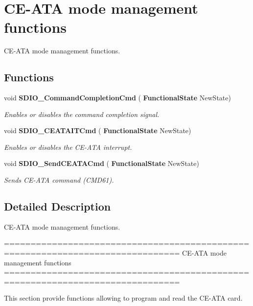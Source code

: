 \section{C\+E-\/\+A\+TA mode management functions}
\label{group__SDIO__Group5}


C\+E-\/\+A\+TA mode management functions.  


\subsection*{Functions}
\begin{DoxyCompactItemize}
\item 
void \textbf{ S\+D\+I\+O\+\_\+\+Command\+Completion\+Cmd} (\textbf{ Functional\+State} New\+State)
\begin{DoxyCompactList}\small\item\em Enables or disables the command completion signal. \end{DoxyCompactList}\item 
void \textbf{ S\+D\+I\+O\+\_\+\+C\+E\+A\+T\+A\+I\+T\+Cmd} (\textbf{ Functional\+State} New\+State)
\begin{DoxyCompactList}\small\item\em Enables or disables the C\+E-\/\+A\+TA interrupt. \end{DoxyCompactList}\item 
void \textbf{ S\+D\+I\+O\+\_\+\+Send\+C\+E\+A\+T\+A\+Cmd} (\textbf{ Functional\+State} New\+State)
\begin{DoxyCompactList}\small\item\em Sends C\+E-\/\+A\+TA command (C\+M\+D61). \end{DoxyCompactList}\end{DoxyCompactItemize}


\subsection{Detailed Description}
C\+E-\/\+A\+TA mode management functions. 

\begin{DoxyVerb} ===============================================================================
              CE-ATA mode management functions
 ===============================================================================  

  This section provide functions allowing to program and read the CE-ATA card.\end{DoxyVerb}
 

